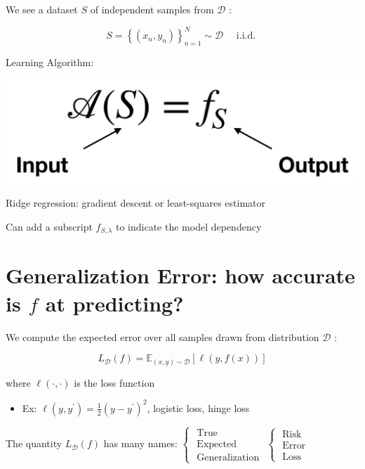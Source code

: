\documentclass[10pt]{article}
\begin{document}
We see a dataset $S$ of independent samples from $\mathscr{D}$ :

$$
S=\left\{\left(x_{n}, y_{n}\right)\right\}_{n=1}^{N} \sim \mathscr{D} \quad \text { i.i.d. }
$$

Learning Algorithm:

\begin{center}
\includegraphics[max width=\textwidth]{2023_12_30_b4c98a1755bce7fa9493g-05}
\end{center}

Ridge regression: gradient descent or least-squares estimator

Can add a subscript $f_{S, \lambda}$ to indicate the model dependency

\section*{Generalization Error: how accurate is $f$ at predicting?}
We compute the expected error over all samples drawn from distribution $\mathscr{D}$ :

$$
L_{\mathscr{D}}(f)=\mathbb{E}_{(x, y) \sim \mathscr{D}}[\ell(y, f(x))]
$$

where $\ell(\cdot, \cdot)$ is the loss function

\begin{itemize}
  \item Ex: $\ell\left(y, y^{\prime}\right)=\frac{1}{2}\left(y-y^{\prime}\right)^{2}$, logistic loss, hinge loss
\end{itemize}

The quantity $L_{\mathscr{D}}(f)$ has many names: $\left\{\begin{array}{l}\text { True } \\ \text { Expected } \\ \text { Generalization }\end{array}\left\{\begin{array}{l}\text { Risk } \\ \text { Error } \\ \text { Loss }\end{array}\right.\right.$
\end{document}
